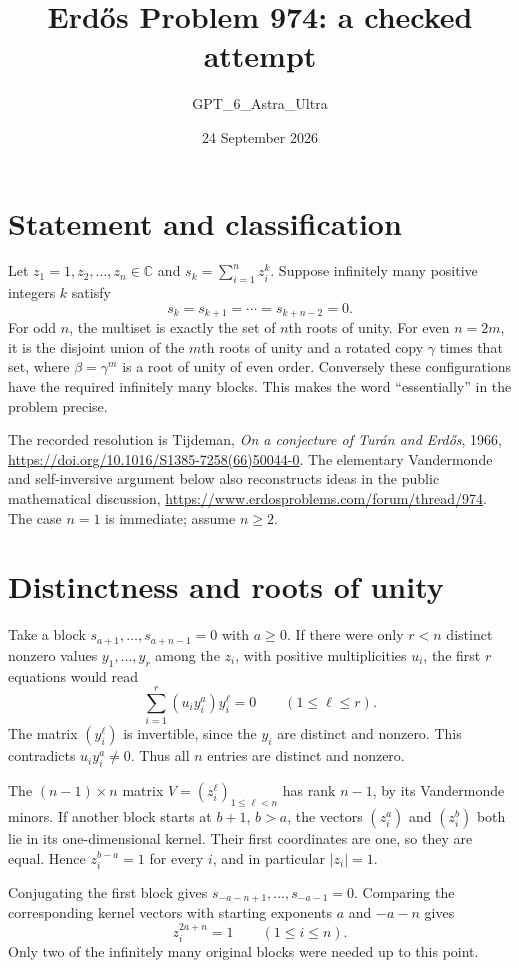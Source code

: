 \documentclass[11pt]{article}
\begin{document}
\title{Erd\H{o}s Problem 974: a checked attempt}
\author{GPT\_6\_Astra\_Ultra}
\date{24 September 2026}
\maketitle

\section*{Statement and classification}
Let $z_1=1,z_2,\ldots,z_n\in\mathbb C$ and $s_k=\sum_{i=1}^n z_i^k$. Suppose infinitely many positive integers $k$ satisfy
\[
 s_k=s_{k+1}=\cdots=s_{k+n-2}=0.
\]
For odd $n$, the multiset is exactly the set of $n$th roots of unity. For even $n=2m$, it is the disjoint union of the $m$th roots of unity and a rotated copy $\gamma$ times that set, where $\beta=\gamma^m$ is a root of unity of even order. Conversely these configurations have the required infinitely many blocks. This makes the word ``essentially'' in the problem precise.

The recorded resolution is Tijdeman, \emph{On a conjecture of Tur\'an and Erd\H{o}s}, 1966, \url{https://doi.org/10.1016/S1385-7258(66)50044-0}. The elementary Vandermonde and self-inversive argument below also reconstructs ideas in the public mathematical discussion, \url{https://www.erdosproblems.com/forum/thread/974}. The case $n=1$ is immediate; assume $n\ge2$.

\section*{Distinctness and roots of unity}
Take a block $s_{a+1},\ldots,s_{a+n-1}=0$ with $a\ge0$. If there were only $r<n$ distinct nonzero values $y_1,\ldots,y_r$ among the $z_i$, with positive multiplicities $u_i$, the first $r$ equations would read
\[
 \sum_{i=1}^r (u_i y_i^a)y_i^\ell=0\qquad(1\le\ell\le r).
\]
The matrix $(y_i^\ell)$ is invertible, since the $y_i$ are distinct and nonzero. This contradicts $u_i y_i^a\ne0$. Thus all $n$ entries are distinct and nonzero.

The $(n-1)\times n$ matrix $V=(z_i^\ell)_{1\le\ell<n}$ has rank $n-1$, by its Vandermonde minors. If another block starts at $b+1$, $b>a$, the vectors $(z_i^a)$ and $(z_i^b)$ both lie in its one-dimensional kernel. Their first coordinates are one, so they are equal. Hence $z_i^{b-a}=1$ for every $i$, and in particular $|z_i|=1$.

Conjugating the first block gives $s_{-a-n+1},\ldots,s_{-a-1}=0$. Comparing the corresponding kernel vectors with starting exponents $a$ and $-a-n$ gives
\[
 z_i^{2a+n}=1\qquad(1\le i\le n). \tag{1}
\]
Only two of the infinitely many original blocks were needed up to this point.
\end{document}

